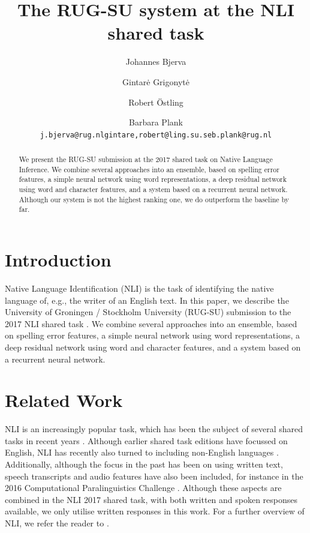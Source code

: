 \documentclass[11pt,letterpaper]{article}
\title{The RUG-SU system at the NLI shared task}
\author{Johannes Bjerva \and Gintar\.e Grigonyt\.e \and Robert {\"O}stling \and Barbara Plank \\
{\tt j.bjerva@rug.nl\hfill{gintare,robert}@ling.su.se\hfill b.plank@rug.nl}}
\date{}
\begin{document}
\maketitle

\begin{abstract}
    We present the RUG-SU submission at the 2017 shared task on Native
    Language Inference.
    We combine several approaches into an ensemble, based on spelling error features, a simple neural network using word representations, a deep residual network using word and character features, and a system based on a recurrent neural network.
    Although our system is not the highest ranking one, we do outperform the baseline by far.
\end{abstract}


\section{Introduction}

Native Language Identification (NLI) is the task of identifying the native language of, e.g., the writer of an English text.
In this paper, we describe the University of Groningen / Stockholm University (RUG-SU) submission to the 2017 NLI shared task \citep{nli2017}.
We combine several approaches into an ensemble, based on spelling error features, a simple neural network using word representations, a deep residual network using word and character features, and a system based on a recurrent neural network.

\section{Related Work}

NLI is an increasingly popular task, which has been the subject of several shared tasks in recent years \citep{nli2013,compare2016,nli2017}.
Although earlier shared task editions have focussed on English, NLI has recently also turned to including non-English languages \citep{multilingual-nli}.
Additionally, although the focus in the past has been on using written text, speech transcripts and audio features have also been included, for instance in the 2016 Computational Paralinguistics Challenge \citep{compare2016}.
Although these aspects are combined in the NLI 2017 shared task, with both written and spoken responses available, we only utilise written responses in this work.
For a further overview of NLI, we refer the reader to \citet{malmasi2016}.
\end{document}
